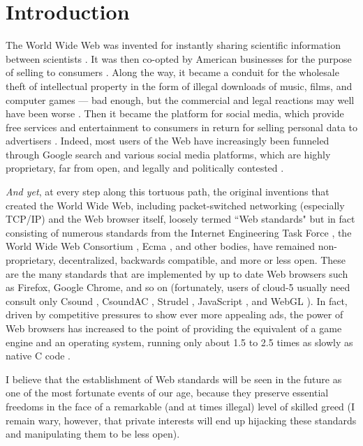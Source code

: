 \documentclass[runningheads,a4paper]{llncs}
\begin{document}
\section{Introduction}

The World Wide Web was invented for instantly sharing scientific information between scientists \cite{www}. It was then co-opted by American businesses for the purpose of selling to consumers \cite{gore}. Along the way, it became a conduit for the wholesale theft of intellectual property in the form of illegal downloads of music, films, and computer games --- bad enough, but the commercial and legal reactions may well have been worse \cite{freeculture}. Then it became the platform for social media, which provide free services and entertainment to consumers in return for selling personal data to advertisers \cite{socialmedia}. Indeed, most users of the Web have increasingly been funneled through Google search and various social media platforms, which are highly proprietary, far from open, and legally and politically contested \cite{surveillance}. 

\emph{And yet}, at every step along this tortuous path, the original inventions that created the World Wide Web, including packet-switched networking (especially TCP/IP) and the Web browser itself, loosely termed ``Web standards" but in fact consisting of numerous standards from the Internet Engineering Task Force \cite{ietf}, the World Wide Web Consortium \cite{w3c}, Ecma \cite{ecma}, and other bodies, have remained non-proprietary, decentralized, backwards compatible, and more or less open. These are the many standards that are implemented by up to date Web browsers such as Firefox, Google Chrome, and so on \cite{html5test}  (fortunately, users of cloud-5 usually need consult only Csound \cite{csoundreference} \cite{csoundapireference}, CsoundAC \cite{csoundacreference}, Strudel \cite{strudel}, JavaScript \cite{javascriptreference}, and WebGL \cite{webglreference}). In fact, driven by competitive pressures to show ever more appealing ads, the power of Web browsers has increased to the point of providing the equivalent of a game engine and an operating system, running only about 1.5 to 2.5  times as slowly as native C code \cite{wasmspeed}. 

I believe that the establishment of Web standards will be seen in the future as one of the most fortunate events of our age, because they preserve essential freedoms in the face of a remarkable (and at times illegal) level of skilled greed (I remain wary, however, that private interests will end up hijacking these standards and manipulating them to be less open).
\end{document}
